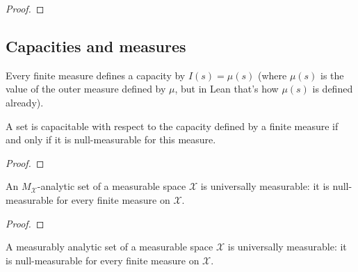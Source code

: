 \begin{proof}\leanok

\end{proof}



\subsection{Capacities and measures}


\begin{definition}\label{def:Measure.capacity}
  \leanok
Every finite measure defines a capacity by $I(s) = \mu(s)$ (where $\mu(s)$ is the value of the outer measure defined by $\mu$, but in Lean that's how $\mu(s)$ is defined already).
\end{definition}


\begin{lemma}\label{lem:isCapacitable_measure_iff}
  \leanok
A set is capacitable with respect to the capacity defined by a finite measure if and only if it is null-measurable for this measure.
\end{lemma}

\begin{proof}\leanok

\end{proof}


\begin{lemma}\label{lem:IsPavingAnalytic.nullMeasurableSet}
  \leanok
An $M_{\mathcal{X}}$-analytic set of a measurable space $\mathcal{X}$ is universally measurable: it is null-measurable for every finite measure on $\mathcal{X}$.
\end{lemma}

\begin{proof}\leanok

\end{proof}


\begin{lemma}\label{lem:IsMeasurableAnalytic.nullMeasurableSet}
  \leanok
A measurably analytic set of a measurable space $\mathcal{X}$ is universally measurable: it is null-measurable for every finite measure on $\mathcal{X}$.
\end{lemma}

